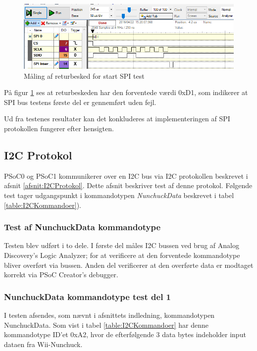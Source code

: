 \begin{figure}[H]
	\centering
	\includegraphics[width=\textwidth]{Test/images/SPItest/SPItestSPIOK1}
	\caption{Måling af returbesked for start SPI test} 
	\label{fig:SPItestSPIOK}
\end{figure}

På figur \ref{fig:SPItestSPIOK} ses at returbeskeden har den forventede værdi 0xD1, som indikerer at SPI bus testens første del er gennemført uden fejl.

Ud fra testenes resultater kan det konkluderes at implementeringen af SPI protokollen fungerer efter hensigten.



\subsection{I2C Protokol}
PSoC0 og PSoC1 kommunikerer over en I2C bus via I2C protokollen beskrevet i afsnit \ref{afsnit:I2CProtokol}. Dette afsnit beskriver test af denne protokol. Følgende test tager udgangspunkt i kommandotypen \textit{NunchuckData} beskrevet i tabel \ref{table:I2CKommandoer}).

\subsubsection{Test af NunchuckData kommandotype} 

Testen blev udført i to dele. I første del måles I2C bussen ved brug af Analog Discovery's Logic Analyzer; for at verificere at den forventede kommandotype bliver overført via bussen. Anden del verificerer at den overførte data er modtaget korrekt via PSoC Creator's debugger.

\subsubsection{NunchuckData kommandotype test del 1}

I testen afsendes, som nævnt i afsnittets indledning, kommandotypen NunchuckData. Som vist i tabel \ref{table:I2CKommandoer} har denne kommandotype ID'et 0xA2, hvor de efterfølgende 3 data bytes indeholder input dataen fra Wii-Nunchuck.

